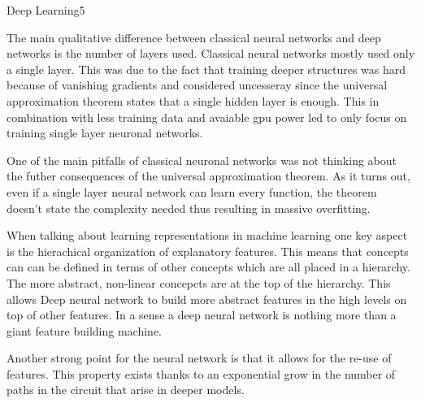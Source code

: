\begin{questions}
\begin{question}[bonus]{Deep Learning}{5}
\begin{answer}
The main qualitative difference between classical neural networks and deep networks is the number of layers used. Classical neural networks mostly used only a single layer. This was due to the fact that training deeper structures was hard because of vanishing gradients and considered uncesseray since the universal approximation theorem states that a single hidden layer is enough. This in combination with less training data and avaiable gpu power led to only focus on training single layer neuronal networks. 

One of the main pitfalls of classical neuronal networks was not thinking about the futher consequences of the universal approximation theorem. As it turns out, even if a single layer neural network can learn every function, the theorem doesn't state the complexity needed thus resulting in massive overfitting. 

When talking about learning representations in machine learning one key aspect is the hierachical organization of explanatory features. This means that concepts can can be defined in terms of other concepts which are all placed in a hierarchy. The more abstract, non-linear concepcts are at the top of the hierarchy. This allows Deep neural network to build more abstract features in the high levels on top of other features. In a sense a deep neural network is nothing more than a giant feature building machine. 

Another strong point for the neural network is that it allows for the re-use of features. This property exists thanks to an exponential grow in the number of paths in the circuit that arise in deeper models. 


\end{answer}

\end{question}


\end{questions}
